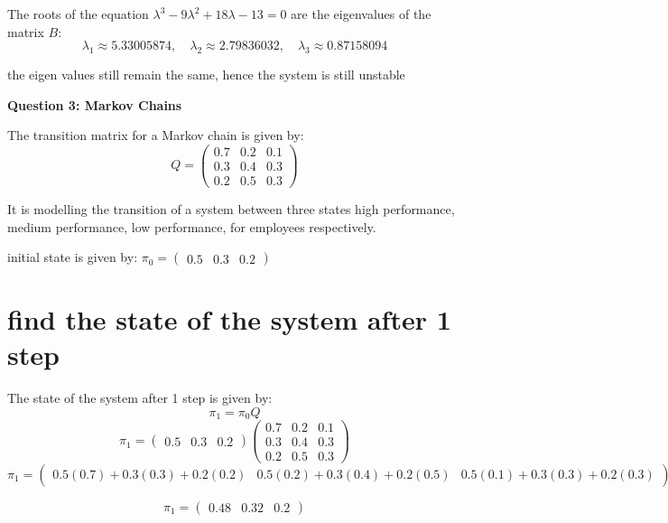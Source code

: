 \documentclass{article}
\begin{document}
The roots of the equation \(\lambda^3 - 9\lambda^2 + 18\lambda - 13 = 0\) are the eigenvalues of the matrix \(B\):
\[\lambda_1 \approx 5.33005874, \quad \lambda_2 \approx 2.79836032, \quad \lambda_3 \approx 0.87158094\]

the eigen values still remain the same, hence the system is still unstable

\begin{center}
    \large \textbf{Question 3: Markov Chains}
\end{center}

The transition matrix for a Markov chain is given by:
\[Q=\begin{pmatrix}
0.7 & 0.2 & 0.1 \\
0.3 & 0.4 & 0.3 \\
0.2 & 0.5 & 0.3
\end{pmatrix}\]

It is modelling the transition of a system between three states high performance, medium performance, low performance, for employees respectively.


initial state is given by: \(\pi_0 = \begin{pmatrix} 0.5 & 0.3 & 0.2 \end{pmatrix}\)

\section{find the state of the system after 1 step}
The state of the system after 1 step is given by:
\[\pi_1 = \pi_0Q\]
\[\pi_1 = \begin{pmatrix} 0.5 & 0.3 & 0.2 \end{pmatrix}\begin{pmatrix}0.7 & 0.2 & 0.1 \\ 0.3 & 0.4 & 0.3 \\ 0.2 & 0.5 & 0.3\end{pmatrix}\]
\[\pi_1 = \begin{pmatrix}
0.5(0.7) + 0.3(0.3) + 0.2(0.2) & 0.5(0.2) + 0.3(0.4) + 0.2(0.5) & 0.5(0.1) + 0.3(0.3) + 0.2(0.3)
\end{pmatrix}\]

\[\pi_1 = \begin{pmatrix}0.48 & 0.32 & 0.2\end{pmatrix}\]
\end{document}
